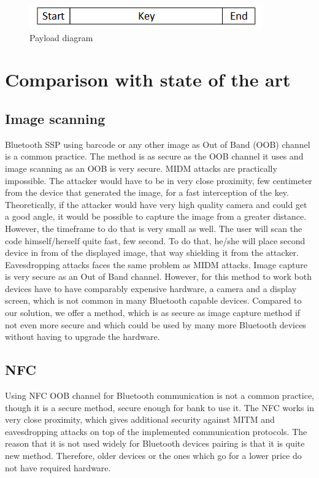 \documentclass[12pt]{article}
\begin{document}
\begin{figure}[h!]
    \includegraphics[scale=1]{fig/payload.png}
    \caption{Payload diagram}
\end{figure}


\newpage

\section{Comparison with state of the art}
\label{sec:Comparison with state of the art}

\subsection{Image scanning}
\label{sub:Image scanning}

Bluetooth SSP using barcode or any other image as Out of Band (OOB) channel is a common practice. The method is as secure as the OOB channel it uses and image scanning as an OOB is very secure. MIDM attacks are practically impossible. The attacker would have to be in very close proximity, few centimeter from the device that generated the image, for a fast interception of the key. Theoretically, if the attacker would have very high quality camera and could get a good angle, it would be possible to capture the image from a greater distance. However, the timeframe to do that is very small as well. The user will scan the code himself/herself quite fast, few second. To do that, he/she will place second device in from of the displayed image, that way shielding it from the attacker. Eavesdropping attacks faces the same problem as MIDM attacks.
Image capture is very secure as an Out of Band channel. However, for this method to work both devices have to have comparably expensive hardware, a camera and a display screen, which is not common in many Bluetooth capable devices. Compared to our solution, we offer a method, which is as secure as image capture method if not even more secure and which could be used by many more Bluetooth devices without having to upgrade the hardware.

\subsection{NFC}
\label{sub:Image scanning}

Using NFC OOB channel for Bluetooth communication is not a common practice, though it is a secure method, secure enough for bank to use it. The NFC works in very close proximity, which gives additional security against MITM and eavesdropping attacks on top of the implemented communication protocols. The reason that it is not used widely for Bluetooth devices pairing is that it is quite new method. Therefore, older devices or the ones which go for a lower price do not have required hardware.
\end{document}
